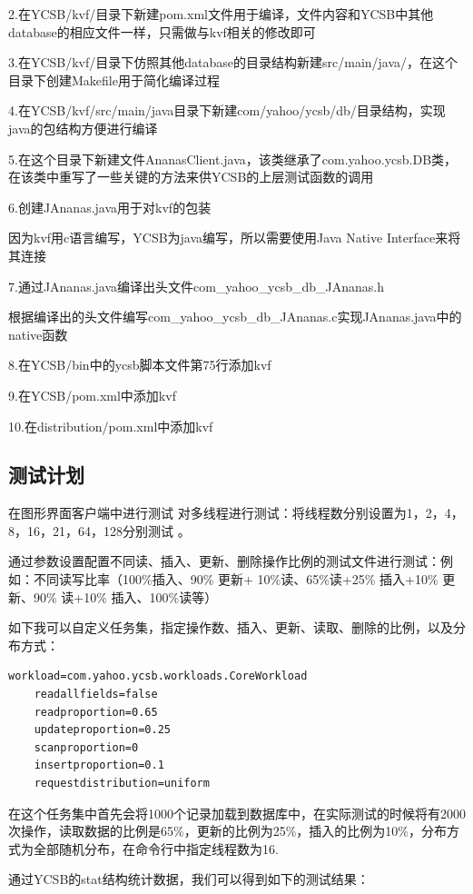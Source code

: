 	2.在YCSB/kvf/目录下新建pom.xml文件用于编译，文件内容和YCSB中其他database的相应文件一样，只需做与kvf相关的修改即可

	3.在YCSB/kvf/目录下仿照其他database的目录结构新建src/main/java/，在这个目录下创建Makefile用于简化编译过程

	4.在YCSB/kvf/src/main/java目录下新建com/yahoo/ycsb/db/目录结构，实现java的包结构方便进行编译

	5.在这个目录下新建文件AnanasClient.java，该类继承了com.yahoo.ycsb.DB类，在该类中重写了一些关键的方法来供YCSB的上层测试函数的调用

	6.创建JAnanas.java用于对kvf的包装

		因为kvf用c语言编写，YCSB为java编写，所以需要使用Java Native Interface来将其连接

	7.通过JAnanas.java编译出头文件com\_yahoo\_ycsb\_db\_JAnanas.h

	根据编译出的头文件编写com\_yahoo\_ycsb\_db\_JAnanas.c实现JAnanas.java中的native函数

	8.在YCSB/bin中的ycsb脚本文件第75行添加kvf

	9.在YCSB/pom.xml中添加kvf

	10.在distribution/pom.xml中添加kvf

	\subsection{测试计划}
	在图形界面客户端中进行测试
	对多线程进行测试：将线程数分别设置为1，2，4，8，16，21，64，128分别测试
。

	通过参数设置配置不同读、插入、更新、删除操作比例的测试文件进行测试：例如：不同读写比率（100\%插入、90\% 更新+ 10\%读、65\%读+25\% 插入+10\% 更新、90\% 读+10\% 插入、100\%读等）

	如下我可以自定义任务集，指定操作数、插入、更新、读取、删除的比例，以及分布方式：
\begin{Verbatim}[frame = single]
    workload=com.yahoo.ycsb.workloads.CoreWorkload
    readallfields=false
    readproportion=0.65
    updateproportion=0.25
    scanproportion=0
    insertproportion=0.1
    requestdistribution=uniform
\end{Verbatim}

	在这个任务集中首先会将1000个记录加载到数据库中，在实际测试的时候将有2000次操作，读取数据的比例是65\%，更新的比例为25\%，插入的比例为10\%，分布方式为全部随机分布，在命令行中指定线程数为16.

	通过YCSB的stat结构统计数据，我们可以得到如下的测试结果：

